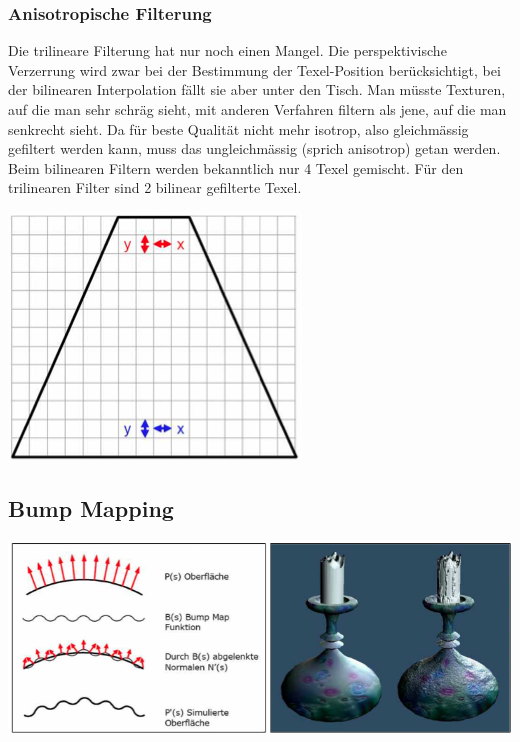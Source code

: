 \documentclass[10pt]{article}
\begin{document}
\subsubsection{Anisotropische Filterung}
Die trilineare Filterung hat nur noch einen Mangel. Die perspektivische Verzerrung wird zwar bei der Bestimmung der Texel-Position berücksichtigt, bei der bilinearen Interpolation fällt sie aber unter den Tisch. Man müsste Texturen, auf die man sehr schräg sieht, mit anderen Verfahren filtern als jene, auf die man senkrecht sieht. Da für beste Qualität nicht mehr isotrop, also gleichmässig gefiltert werden kann, muss das ungleichmässig (sprich anisotrop) getan werden. Beim bilinearen Filtern werden bekanntlich nur 4 Texel gemischt. Für den trilinearen Filter sind 2 bilinear gefilterte Texel.
\begin{center}
	\includegraphics[scale=0.4]{anisotropische_filterung.png}
\end{center}

\subsection{Bump Mapping}
\begin{center}
	\includegraphics[scale=0.3]{bump_mapping.png}
\end{center}
\end{document}

